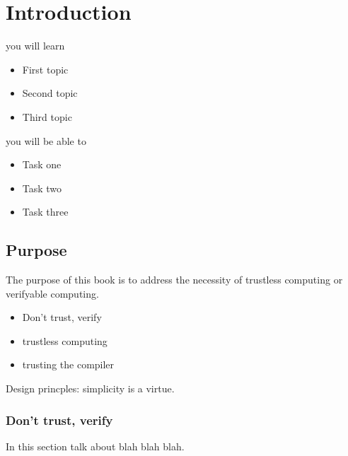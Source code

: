 \setchapterpreamble[u]{\margintoc}
\chapter{Introduction}

%
\begin{kaobox}[frametitle=In This Chapter]
you will learn
\begin{itemize}
	\item First topic
	\item Second topic
        \item Third topic
\end{itemize}

you will be able to
\begin{itemize}
        \item Task one
        \item Task two
        \item Task three
\end{itemize}
\end{kaobox}

\blindtext

%
\section{Purpose}

The purpose of this book is to address the necessity of trustless 
computing or verifyable computing.

\begin{itemize}
	\item Don't trust, verify
	\item trustless computing
	\item trusting the compiler
\end{itemize}

Design princples: simplicity is a virtue.

\subsection*{Don't trust, verify}
In this section talk about blah blah blah.

